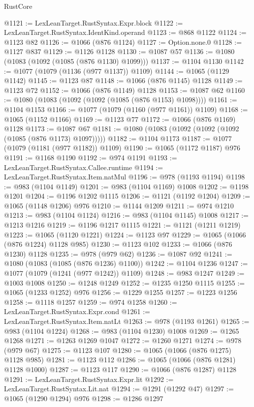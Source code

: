 \begin{lexlean}{RustCore}
\begin{coremodule}
@1121 := LexLeanTarget.RustSyntax.Expr.block
@1122 := LexLeanTarget.RustSyntax.IdentKind.operand
@1123 := @868 @1122
@1124 := @1123 @82
@1126 := @1066 (@876 @1124)
@1127 := Option.none.{0}
@1128 := @1127 @837
@1129 := @1126 @1128
@1130 := @1087 @57
@1136 := @1080 (@1083 (@1092 (@1085 (@876 @1130) @1099)))
@1137 := @1104 @1130
@1142 := @1077 (@1079 (@1136 (@977 @1137)) @1109)
@1144 := @1065 (@1129 @1142)
@1145 := @1123 @87
@1148 := @1066 (@876 @1145) @1128
@1149 := @1123 @72
@1152 := @1066 (@876 @1149) @1128
@1153 := @1087 @62
@1160 := @1080 (@1083 (@1092 (@1092 (@1085 (@876 @1153) @1098))))
@1161 := @1104 @1153
@1166 := @1077 (@1079 (@1160 (@977 @1161)) @1109)
@1168 := @1065 (@1152 @1166)
@1169 := @1123 @77
@1172 := @1066 (@876 @1169) @1128
@1173 := @1087 @67
@1181 := @1080 (@1083 (@1092 (@1092 (@1092 (@1085 (@876 @1173) @1097)))))
@1182 := @1104 @1173
@1187 := @1077 (@1079 (@1181 (@977 @1182)) @1109)
@1190 := @1065 (@1172 @1187) @976
@1191 := @1168 @1190
@1192 := @974 @1191
@1193 := LexLeanTarget.RustSyntax.Callee.runtime
@1194 := LexLeanTarget.RustSyntax.Item.natMul
@1196 := @978 (@1193 @1194)
@1198 := @983 (@1104 @1149)
@1201 := @983 (@1104 @1169) @1008
@1202 := @1198 @1201
@1204 := @1196 @1202 @1115
@1206 := @1121 (@1192 @1204)
@1209 := @1065 (@1148 @1206) @976
@1210 := @1144 @1209
@1211 := @974 @1210
@1213 := @983 (@1104 @1124)
@1216 := @983 (@1104 @1145) @1008
@1217 := @1213 @1216
@1219 := @1196 @1217 @1115
@1221 := @1121 (@1211 @1219)
@1223 := @1065 (@1120 @1221)
@1224 := @1123 @97
@1229 := @1065 (@1066 (@876 @1224) @1128 @985)
@1230 := @1123 @102
@1233 := @1066 (@876 @1230) @1128
@1235 := @978 (@979 @62)
@1236 := @1087 @92
@1241 := @1080 (@1083 (@1085 (@876 @1236) @1100))
@1242 := @1104 @1236
@1247 := @1077 (@1079 (@1241 (@977 @1242)) @1109)
@1248 := @983 @1247
@1249 := @1003 @1008
@1250 := @1248 @1249
@1252 := @1235 @1250 @1115
@1255 := @1065 (@1233 @1252) @976
@1256 := @1229 @1255
@1257 := @1223 @1256
@1258 := @1118 @1257
@1259 := @974 @1258
@1260 := LexLeanTarget.RustSyntax.Expr.cond
@1261 := LexLeanTarget.RustSyntax.Item.natLt
@1263 := @978 (@1193 @1261)
@1265 := @983 (@1104 @1224)
@1268 := @983 (@1104 @1230) @1008
@1269 := @1265 @1268
@1271 := @1263 @1269 @1047
@1272 := @1260 @1271
@1274 := @978 (@979 @67)
@1275 := @1123 @107
@1280 := @1065 (@1066 (@876 @1275) @1128 @985)
@1281 := @1123 @112
@1286 := @1065 (@1066 (@876 @1281) @1128 @1000)
@1287 := @1123 @117
@1290 := @1066 (@876 @1287) @1128
@1291 := LexLeanTarget.RustSyntax.Expr.lit
@1292 := LexLeanTarget.RustSyntax.Lit.nat
@1294 := @1291 (@1292 @47)
@1297 := @1065 (@1290 @1294) @976
@1298 := @1286 @1297

\end{coremodule}
\end{lexlean}
